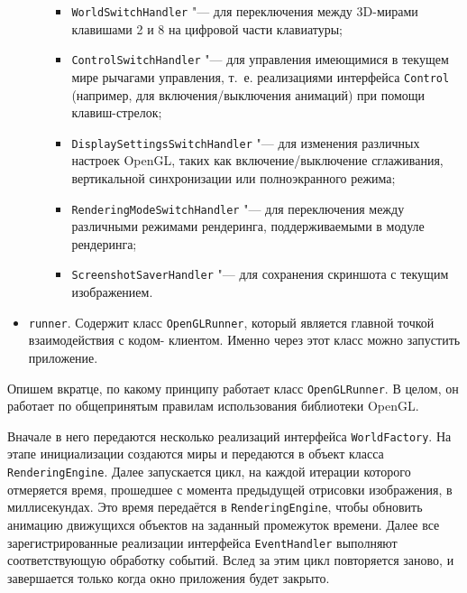 \begin{itemize}
\begin{itemize}
        \begin{itemize}
        \item \texttt{WorldSwitchHandler} "--- для переключения между 3D-мирами клавишами 2 и 8 на цифровой части
        клавиатуры;
        \item \texttt{ControlSwitchHandler} "--- для управления имеющимися в текущем мире рычагами управления, т.~е.
        реализациями интерфейса \texttt{Control} (например, для включения/выключения анимаций) при помощи кла\-виш-стрелок;
        \item \texttt{DisplaySettingsSwitchHandler} "--- для изменения различных настроек OpenGL, таких как
        включение/выключение сглаживания, вертикальной синхронизации или полноэкранного режима;
        \item \texttt{RenderingModeSwitchHandler} "--- для переключения между различными режимами рендеринга,
        поддерживаемыми в модуле рендеринга;
        \item \texttt{ScreenshotSaverHandler} "--- для сохранения скриншота с текущим изображением.
        \end{itemize}

    \end{itemize}

\item \texttt{runner}. Содержит класс \texttt{OpenGLRunner}, который является главной точкой взаимодействия с кодом-
клиентом. Именно через этот класс можно запустить приложение.

\end{itemize}

Опишем вкратце, по какому принципу работает класс \texttt{OpenGLRunner}. В целом, он работает по общепринятым правилам
использования библиотеки OpenGL.

Вначале в него передаются несколько реализаций интерфейса \texttt{WorldFac\-tory}. На этапе инициализации создаются миры
и передаются в объект класса \texttt{Rende\-ringEngine}. Далее запускается цикл, на каждой итерации которого отмеряется
время, прошедшее с момента предыдущей отрисовки изображения, в миллисекундах. Это время передаётся в
\texttt{RenderingEngine}, чтобы обновить анимацию движущихся объектов на заданный промежуток времени. Далее все
зарегистрированные реализации интерфейса \texttt{EventHandler} выполняют соответствующую обработку событий. Вслед
за этим цикл повторяется заново, и завершается только когда окно приложения будет закрыто.
